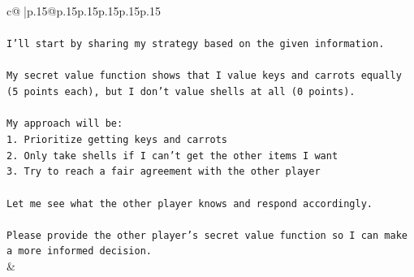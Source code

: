 \documentclass{article}
\begin{document}
{\begin{supertabular}{c@{$\;$}|p{.15\linewidth}@{}p{.15\linewidth}p{.15\linewidth}p{.15\linewidth}p{.15\linewidth}p{.15\linewidth}}
{{{\\ 
\\ 
\texttt{I'll start by sharing my strategy based on the given information.} \\
\\ 
\texttt{My secret value function shows that I value keys and carrots equally (5 points each), but I don't value shells at all (0 points). } \\
\\ 
\texttt{My approach will be:} \\
\texttt{1. Prioritize getting keys and carrots} \\
\texttt{2. Only take shells if I can't get the other items I want} \\
\texttt{3. Try to reach a fair agreement with the other player} \\
\\ 
\texttt{Let me see what the other player knows and respond accordingly.} \\
\\ 
\texttt{Please provide the other player's secret value function so I can make a more informed decision.} \\
            }
        }
    }
    & \\ \\


\end{supertabular}}
\end{document}
